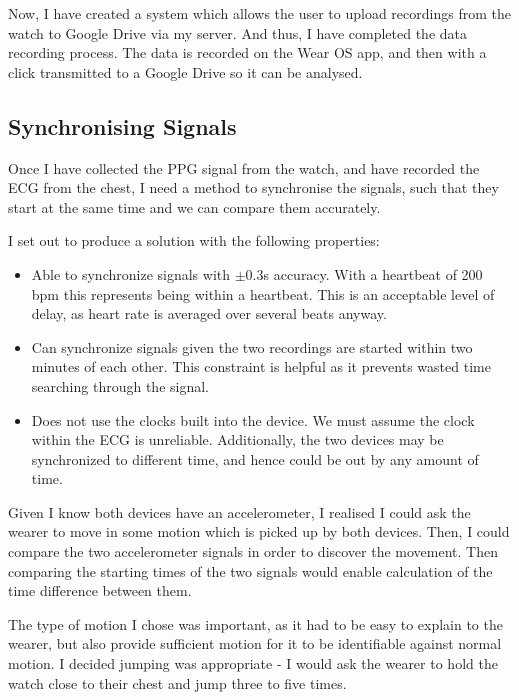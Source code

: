 \documentclass[12pt,a4paper,twoside,openright]{report}
\begin{document}
Now, I have created a system which allows the user to upload recordings from
the watch to Google Drive via my server. And thus, I have completed the data
recording process. The data is recorded on the Wear OS app, and then with a
click transmitted to a Google Drive so it can be analysed.

\subsection{Synchronising Signals} \label{section:sync}

Once I have collected the PPG signal from the watch, and have recorded the ECG
from the chest, I need a method to synchronise the signals, such that they
start at the same time and we can compare them accurately.

I set out to produce a solution with the following properties:
\begin{itemize}
	\item Able to synchronize signals with \(\pm0.3\)s accuracy. With a
		heartbeat of 200 bpm this represents being within a heartbeat.
		This is an acceptable level of delay, as heart rate is
		averaged over several beats anyway.

	\item Can synchronize signals given the two recordings are started
		within two minutes of each other. This constraint is helpful
		as it prevents wasted time searching through the signal.

	\item Does not use the clocks built into the device. We must assume
		the clock within the ECG is unreliable. Additionally, the two
		devices may be synchronized to different time, and hence could
		be out by any amount of time.
\end{itemize}

Given I know both devices have an accelerometer, I realised I could ask the
wearer to move in some motion which is picked up by both devices. Then, I
could compare the two accelerometer signals in order to discover the
movement. Then comparing the starting times of the two signals would enable
calculation of the time difference between them.

The type of motion I chose was important, as it had to be easy to explain to
the wearer, but also provide sufficient motion for it to be identifiable
against normal motion. I decided jumping was appropriate -
I would ask the wearer to hold the watch close to their chest and jump three
to five times.
\end{document}
